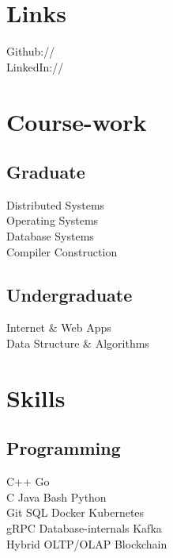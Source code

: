\documentclass[]{deedy-resume-openfont}
\begin{document}
\begin{minipage}[t]{0.30\textwidth}
\section{Links} 
Github:// \href{https://github.com/shankur/}{} \\
LinkedIn://  \href{https://www.linkedin.com/in/shankur}{} \\
\sectionsep


\section{Course-work} 
\subsection{Graduate}
Distributed Systems \\
Operating Systems \\
Database Systems\\
Compiler Construction \\
\sectionsep

\subsection{Undergraduate}
Internet \& Web Apps \\
Data Structure \& Algorithms\\
\sectionsep


\section{Skills}
\subsection{Programming}
C++ \textbullet{}   Go \\
C \textbullet{} Java \textbullet{} Bash \textbullet{} Python \\
Git \textbullet{} SQL \textbullet{} Docker \textbullet{} Kubernetes \\
gRPC \textbullet{} Database-internals \textbullet{} Kafka \\
Hybrid OLTP/OLAP \textbullet{} Blockchain
\sectionsep


\end{minipage}
\end{document}
